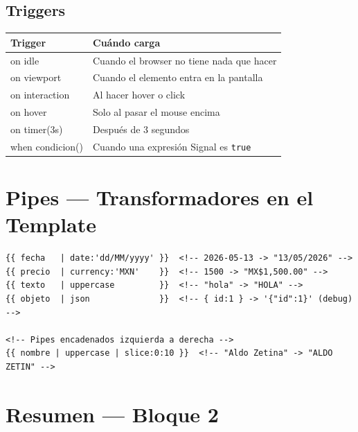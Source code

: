 \documentclass[12pt, a4paper]{article}
\begin{document}
\subsection{ Triggers}
\begin{center}
\renewcommand{\arraystretch}{1.5}
\begin{tabular}{>{\ttfamily}p{4.5cm} p{8cm}}
\toprule
Trigger & Cuándo carga \\
\midrule
on idle & Cuando el browser no tiene nada que hacer \\
on viewport & Cuando el elemento entra en la pantalla \\
on interaction & Al hacer hover o click \\
on hover & Solo al pasar el mouse encima \\
on timer(3s) & Después de 3 segundos \\
when condicion() & Cuando una expresión Signal es \texttt{true} \\
\bottomrule
\end{tabular}
\end{center}

\section{  Pipes — Transformadores en el Template}

\begin{lstlisting}
{{ fecha   | date:'dd/MM/yyyy' }}  <!-- 2026-05-13 -> "13/05/2026" -->
{{ precio  | currency:'MXN'    }}  <!-- 1500 -> "MX$1,500.00" -->
{{ texto   | uppercase         }}  <!-- "hola" -> "HOLA" -->
{{ objeto  | json              }}  <!-- { id:1 } -> '{"id":1}' (debug) -->

<!-- Pipes encadenados izquierda a derecha -->
{{ nombre | uppercase | slice:0:10 }}  <!-- "Aldo Zetina" -> "ALDO ZETIN" -->
\end{lstlisting}

\section{  Resumen — Bloque 2}
\end{document}
